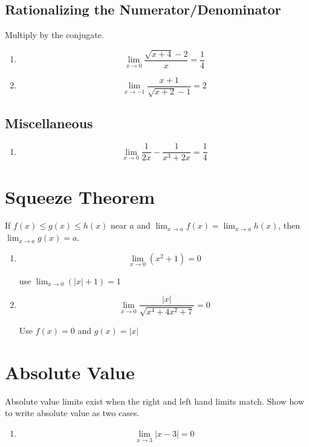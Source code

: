 \documentclass[letterpaper, landscape]{exam}
\begin{document}
  \subsection{Rationalizing the Numerator/Denominator}

  Multiply by the conjugate.

  \begin{enumerate}
    \item 
      \[
        \lim_{x \to 0} \frac{\sqrt{x + 4} - 2}{x} = \boxed{ \frac{1}{4} }
      \]

    \item 
      \[
        \lim_{x \to -1} \frac{x+1}{\sqrt{x+2}-1} = \boxed{ 2 }
      \]
  \end{enumerate}

  \subsection{Miscellaneous}

  \begin{enumerate}
    \item 
      \[
        \lim_{x \to 0} \frac{1}{2x} - \frac{1}{x^3 + 2x} = \boxed{ \frac{1}{4} }
      \]
  \end{enumerate}


  \section{Squeeze Theorem}
  
  If $f(x) \leq g(x) \leq h(x)$ near $a$ and 
  $\lim_{x \to a} f(x) = \lim_{x \to a} h(x)$, then $\lim_{x \to a} g(x) = a$.

  \begin{enumerate}
    \item 
      \[
        \lim_{x \to 0} \left( x^2 + 1 \right) = 0 
      \]

      use $\lim_{x \to 0} \left( |x| + 1 \right) = 1$

    \item
      \[
        \lim_{x \to 0} \frac{|x|}{\sqrt{x^4 + 4x^2 + 7}} = 0
      \]

      Use $f(x) = 0$ and $g(x) = |x|$

  \end{enumerate}

  \section{Absolute Value}

  Absolute value limits exist when the right and left hand limits match. Show
  how to write absolute value as two cases.

  \begin{enumerate}
    \item 
      \[
        \lim_{x \to 3} | x - 3 | = \boxed{ 0 }
      \]
  \end{enumerate}
\end{document}
